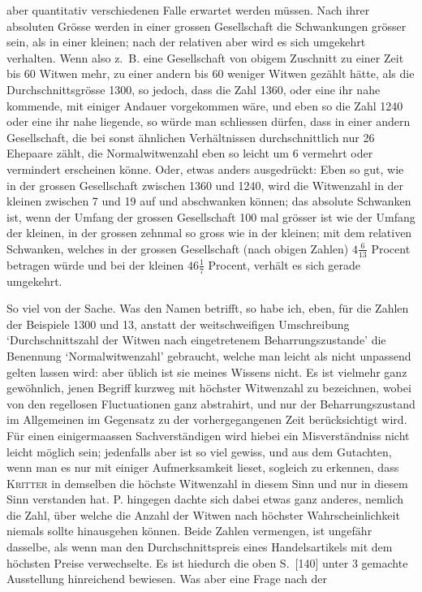 \documentclass[12pt,a4paper]{article}
\begin{document}
aber quantitativ verschiedenen Falle erwartet werden müssen. Nach ihrer absoluten Grösse werden in einer grossen Gesellschaft die Schwankungen grösser sein, als in einer kleinen; nach der relativen aber wird es sich umgekehrt verhalten. Wenn also z.~B. eine Gesellschaft von obigem Zuschnitt zu einer Zeit bis 60 Witwen mehr, zu einer andern bis 60 weniger Witwen gezählt hätte, als die Durchschnittsgrösse 1300, so jedoch, dass die Zahl 1360, oder eine ihr nahe kommende, mit einiger Andauer vorgekommen wäre, und eben so die Zahl 1240 oder eine ihr nahe liegende, so würde man schliessen dürfen, dass in einer andern Gesellschaft, die bei sonst ähnlichen Verhältnissen durchschnittlich nur 26 Ehepaare zählt, die Normalwitwenzahl eben so leicht um 6 vermehrt oder vermindert erscheinen könne. Oder, etwas anders ausgedrückt: Eben so gut, wie in der grossen Gesellschaft zwischen 1360 und 1240, wird die Witwenzahl in der kleinen zwischen 7 und 19 auf und abschwanken können; das absolute Schwanken ist, wenn der Umfang der grossen Gesellschaft 100 mal grösser ist wie der Umfang der kleinen, in der grossen zehnmal so gross wie in der kleinen; mit dem relativen Schwanken, welches in der grossen Gesellschaft (nach obigen Zahlen) $4\frac{6}{13}$ Procent betragen würde und bei der kleinen $46\frac{1}{7}$ Procent, verhält es sich gerade umgekehrt.

So viel von der Sache. Was den Namen betrifft, so habe ich, eben, für die Zahlen der Beispiele 1300 und 13, anstatt der weitschweifigen Umschreibung `Durchschnittszahl der Witwen nach eingetretenem Beharrungszustande' die Benennung `Normalwitwenzahl' gebraucht, welche man leicht als nicht unpassend gelten lassen wird: aber üblich ist sie meines Wissens nicht. Es ist vielmehr ganz gewöhnlich, jenen Begriff kurzweg mit höchster Witwenzahl zu bezeichnen, wobei von den regellosen Fluctuationen ganz abstrahirt, und nur der Beharrungszustand im Allgemeinen im Gegensatz zu der vorhergegangenen Zeit berücksichtigt wird. Für einen einigermaassen Sachverständigen wird hiebei ein Misverständniss nicht leicht möglich sein; jedenfalls aber ist so viel gewiss, und aus dem Gutachten, wenn man es nur mit einiger Aufmerksamkeit lieset, sogleich zu erkennen, dass \textsc{Kritter} in demselben die höchste Witwenzahl in diesem Sinn und nur in diesem Sinn verstanden hat. P. hingegen dachte sich dabei etwas ganz anderes, nemlich die Zahl, über welche die Anzahl der Witwen nach höchster Wahrscheinlichkeit niemals sollte hinausgehen können. Beide Zahlen vermengen, ist ungefähr dasselbe, als wenn man den Durchschnittspreis eines Handelsartikels mit dem höchsten Preise verwechselte. Es ist hiedurch die oben S.~[140] unter 3 gemachte Ausstellung hinreichend bewiesen. Was aber eine Frage nach der
\end{document}
